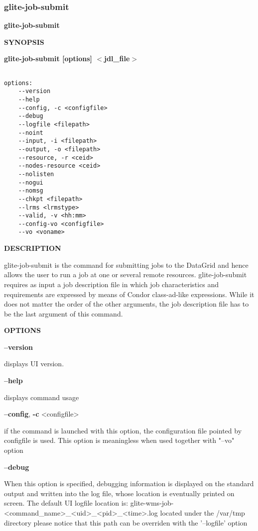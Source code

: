 \subsubsection{glite-job-submit}
\label{glite-job-submit}

\medskip
\textbf{glite-job-submit}
\smallskip


\medskip
\textbf{SYNOPSIS}
\smallskip

\textbf{glite-job-submit [options]  $<$jdl\_file$>$}
{\begin{verbatim}

options:
	--version
	--help
	--config, -c <configfile>
	--debug
	--logfile <filepath>
	--noint
	--input, -i <filepath>
	--output, -o <filepath>
	--resource, -r <ceid>
	--nodes-resource <ceid>
	--nolisten
	--nogui
	--nomsg
	--chkpt <filepath>
	--lrms <lrmstype>
	--valid, -v <hh:mm>
	--config-vo <configfile>
	--vo <voname>
\end{verbatim}

\medskip
\textbf{DESCRIPTION}
\smallskip


glite-job-submit is the command for submitting jobs to the DataGrid and hence allows the user to run a job at one or several remote resources. glite-job-submit requires as input a job description file in which job characteristics and requirements are expressed by means of Condor class-ad-like expressions.
While it does not matter the order of the other arguments, the job description file has to be the last argument of
this command.

\medskip
\textbf{OPTIONS}
\smallskip

\textbf{--version}

displays UI version.

\textbf{--help}

displays command usage

\textbf{--config}, \textbf{-c} <configfile>

if the command is launched with this option, the configuration file pointed by configfile is used. This option is meaningless when used together with "--vo" option

\textbf{--debug}

When this option is specified, debugging information is displayed on the standard output and written into the log file, whose location is eventually printed on screen.
The default UI logfile location is:
glite-wms-job-<command\_name>\_<uid>\_<pid>\_<time>.log  located under the /var/tmp directory
please notice that this path can be overriden with the '--logfile' option

}

